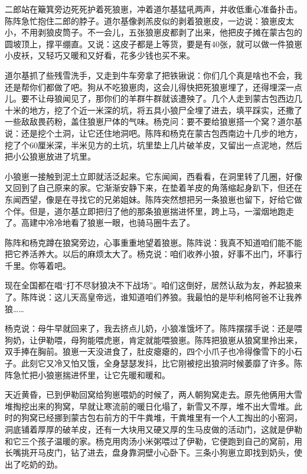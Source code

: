 \par 二郎站在簸箕旁边死死护着死狼崽，冲着道尔基猛吼两声，并收低重心准备扑击。陈阵急忙抱住二郎的脖子。道尔基像剥羔皮似的剥着狼崽皮，一边说：狼崽皮太小，不用剥狼皮筒子。不一会儿，五张狼崽皮都剥了出来，他把皮子摊在蒙古包的圆坡顶上，撑平绷直。又说：这皮子都是上等货，要是有40张，就可以做一件狼崽小皮袄，又轻巧又暖和又好看，花多少钱也买不来。
\par 道尔基抓了些残雪洗手，又走到牛车旁拿了把铁锹说：你们几个真是啥也不会，我还是帮你们都做了吧。狗从不吃狼崽肉，这会儿得快把死狼崽埋了，还得埋深一点儿。要不让母狼闻见了，那你们的羊群牛群就该遭殃了。几个人走到蒙古包西边几十米的地方，挖了个近一米深的坑，将五具小狼尸全埋了进去，填平踩实，还撒了一些敌敌畏药粉，盖住狼崽尸体的气味。杨克问：要不要给狼崽搭一个窝？道尔基说：还是挖个土洞，让它还住地洞吧。陈阵和杨克在蒙古包西南边十几步的地方，挖了个60厘米深，半米见方的土坑，坑里垫上几片破羊皮，又留出一点泥地，然后把小公狼崽放进了坑里。
\par 小狼崽一接触到泥土立即就活泛起来。它东闻闻，西看看，在洞里转了几圈，好像又回到了自己原来的家。它渐渐安静下来，在垫着羊皮的角落缩起身趴下，但还在东闻西望，像是在寻找它的兄弟姐妹。陈阵突然想把另一条狼崽也留下，好给它做个伴。但是，道尔基立即把归了他的那条狼崽揣进怀里，跨上马，一溜烟地跑走了。高建中冷冷地看了狼崽一眼，也骑马圈牛去了。
\par 
\par 陈阵和杨克蹲在狼窝旁边，心事重重地望着狼崽。陈阵说：我真不知道咱们能不能把它养活养大。以后的麻烦太大了。杨克说：咱们收养小狼，好事不出门，坏事行千里。你等着吧。
\par 现在全国都在唱“打不尽豺狼决不下战场”。咱们这倒好，居然认敌为友，养起狼来了。陈阵说：这儿天高皇帝远，谁知道咱们养狼。我最怕的是毕利格阿爸不让我养狼……
\par 杨克说：母牛早就回来了，我去挤点儿奶，小狼准饿坏了。陈阵摆摆手说：还是喂狗奶，让伊勒喂，母狗能喂虎崽，肯定就能喂狼崽。陈阵把狼崽从狼窝里拎出来，双手捧在胸前。狼崽一天没进食了，肚皮瘪瘪的，四个小爪子也冷得像雪下的小石子。此刻它又冷又怕又饿，全身瑟瑟发抖，比它刚被挖出狼洞时候萎靡了许多。陈阵急忙把小狼崽揣进怀里，让它先暖和暖和。
\par 天近黄昏，已到伊勒回窝给狗崽喂奶的时候了，两人朝狗窝走去。原先他俩用大雪堆掏挖出来的狗窝，早就让寒流前的暖日化塌了，新雪又不厚，堆不出大雪堆。此时的狗窝已经挪到蒙古包右前方的干牛粪堆，干粪堆里有一个人工掏出的小窑洞，洞底铺着厚厚的破羊皮，还有一大块用又硬又厚的生马皮做的活动门，这就是伊勒和它三个孩子温暖的家。杨克用肉汤小米粥喂过了伊勒，它便跑到自己的窝前，用长嘴挑开马皮门，钻了进去，盘身靠洞壁小心卧下。三条小狗崽立即找到奶头，使出了吃奶的劲。
